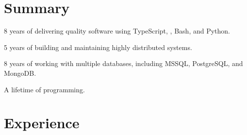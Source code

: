 \documentclass[a4paper,11pt]{article}
\begin{document}
\header%
\section{Summary}
\begin{itemList}
    \item 8 years of delivering quality software using TypeScript, , Bash, and Python.
    \item 5 years of building and maintaining highly distributed systems.
    \item 8 years of working with multiple databases, including MSSQL, PostgreSQL, and MongoDB.
    \item A lifetime of programming.
\end{itemList}
\section{Experience}
\end{document}
